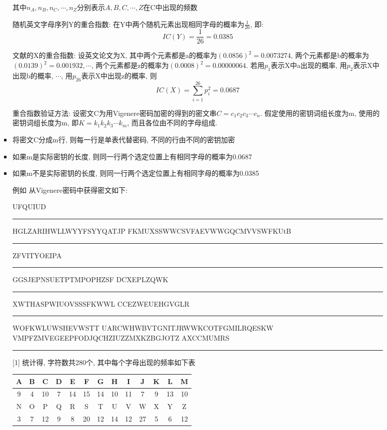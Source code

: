 \documentclass[UTF8]{ctexart}
\newcommand\hl{\bgroup\markoverwith
  {\textcolor{yellow}{\rule[-.5ex]{2pt}{2.5ex}}}\ULon}
\begin{document}
\begin{itemize}
\begin{enumerate}
\begin{itemize}
\begin{itemize}
\begin{itemize}
                        其中$n_A, n_B, n_C, \cdots, n_Z$分别表示$A ,B, C, \cdots, Z$在C中出现的频数

                            随机英文字母序列Y的重合指数: 在Y中两个随机元素出现相同字母的概率为$\frac{1}{26}$, 即:
                            $$IC(Y)=\frac{1}{26}=0.0385$$

                            文献的X的重合指数: 设英文论文为X, 其中两个元素都是a的概率为$(0.0856)^2=0.0073274$, 两个元素都是b的概率为$(0.0139)^2=0.001932, \cdots$, 两个元素都是z的概率为$(0.0008)^2=0.00000064$.
                            若用$p_1$表示X中a出现的概率, 用$p_2$表示X中出现b的概率, $\cdots$, 用$p_{26}$表示X中出现z的概率, 则
                            $$IC(X)=\sum_{i=1}^{26} p_i^2 = 0.0687$$

                            重合指数验证方法: 设密文C为用Vigenere密码加密的得到的密文串$C=c_1c_2c_3\cdots c_n$. 假定使用的密钥词组长度为m, 使用的密钥词组长度为m, 即$K=k_1k_2k_3 \cdots k_m$, 而且各位由不同的字母组成.

                            \item 将密文C分成m行, 则每一行是单表代替密码, 不同的行由不同的密钥加密
                            \item 如果m是实际密钥的长度, 则同一行两个选定位置上有相同字母的概率为0.0687
                            \item 如果m不是实际密钥的长度, 则同一行两个选定位置上有相同字母的概率为0.0385

                            例如 从Vigenere密码中获得密文如下:

                            UFQUIUD\hl{DWF}HGLZARIHWLLWYYFSYYQATJP
                            FKMUXSSWWCSVFAEVWWGQCMVVSWFKUtB\hl{LLG}
                            ZFVITYOEIPA\hl{SJW}GGSJEPNSUETPTMPOPHZSF
                            DCXEPLZQWK\hl{DWF}XWTHASPWIUOVSSSFKWWL
                            CCEZWEUEHGVGLR\hl{LLG}WOFKWLUWSHEVWSTT
                            UARCWHWBVTGNITJRWWKCOTFGMILRQESKW
                            VMPFZMVEGEEPFODJQCHZIUZZMXKZBGJOTZ
                            AXCCMUMRS\hl{SJW}

                            [1] 统计得, 字符数共280个, 其中每个字母出现的频率如下表

                            \begin{tabular}{|c|c|c|c|c|c|c|c|c|c|c|c|c|}
                                \hline
                                A &B &C &D &E &F &G &H &I &J &K &L &M\\
                                \hline
                                9 &4 &10 &7 &14 &15 &14 &10 &11 &7 &9 &13 &10\\
                                \hline
                                \hline
                                N &O &P &Q &R &S &T &U &V &W &X &Y &Z\\
                                \hline
                                3 &7 &12 &9 &8 &20 &12 &14 &12 &27 &5 &6 &12\\
                                \hline
                            \end{tabular}


\end{itemize}
\end{itemize}
\end{itemize}
\end{enumerate}
\end{itemize}
\end{document}
